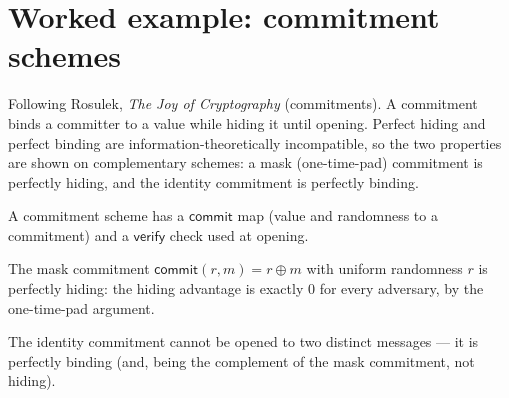 \chapter{Worked example: commitment schemes}

Following Rosulek, \emph{The Joy of Cryptography} (commitments). A commitment binds
a committer to a value while hiding it until opening. Perfect hiding and perfect
binding are information-theoretically incompatible, so the two properties are
shown on complementary schemes: a mask (one-time-pad) commitment is perfectly
hiding, and the identity commitment is perfectly binding.

\begin{definition}
  \label{def:commscheme}
  \leanok
  A commitment scheme has a $\mathsf{commit}$ map (value and randomness to a
  commitment) and a $\mathsf{verify}$ check used at opening.
\end{definition}

\begin{theorem}
  \label{thm:comm-hiding}
  \leanok
  The mask commitment $\mathsf{commit}(r, m) = r \oplus m$ with uniform randomness
  $r$ is perfectly hiding: the hiding advantage is exactly $0$ for every
  adversary, by the one-time-pad argument.
\end{theorem}

\begin{theorem}
  \label{thm:comm-binding}
  \leanok
  The identity commitment cannot be opened to two distinct messages --- it is
  perfectly binding (and, being the complement of the mask commitment, not
  hiding).
\end{theorem}
